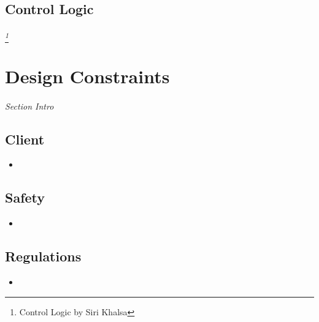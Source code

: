 \documentclass[12pt]{article}
\begin{document}
    \subsection{Control Logic} \label{logic}%
	\paragraph{} \textit{ \footnote{Control Logic by Siri Khalsa}}

%
%	

\section{Design Constraints} \label{cons} %
\paragraph{} \textit{Section Intro}

	\subsection{Client}
	\begin{itemize}
		\item 
	\end{itemize}

	\subsection{Safety}
	\begin{itemize}
		\item 
	\end{itemize}

	\subsection{Regulations}
	\begin{itemize}
		\item 
	\end{itemize}
\end{document}
